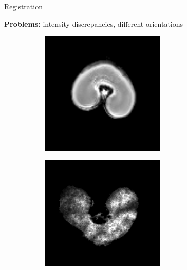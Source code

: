 \documentclass[10pt]{beamer}
\begin{document}
\begin{frame}{Registration}

  \textbf{Problems:} intensity discrepancies, different orientations

   \begin{figure}[ht]
    \centering
    \begin{subfigure}[t]{0.5\textwidth}
      \centering
      \includegraphics[width=0.65\textwidth]{fig/mri_slice6.png}
    \end{subfigure}%
    \begin{subfigure}[t]{0.5\textwidth}
      \centering
      \includegraphics[width=0.65\textwidth]{fig/maldi_slice6}
    \end{subfigure}%

  \end{figure}

 

\end{frame}
\end{document}
